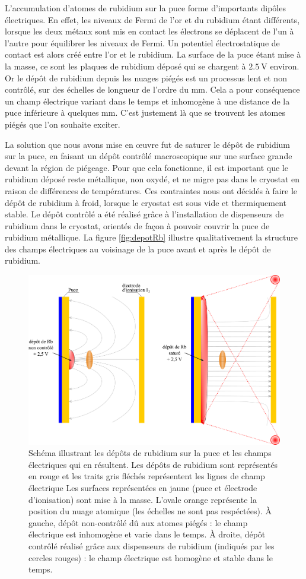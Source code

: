 L'accumulation d'atomes de rubidium sur la puce forme d'importants dipôles électriques.
En effet, les niveaux de Fermi de l'or et du rubidium étant différents, lorsque les deux métaux sont mis en contact les électrons se déplacent de l'un à l'autre pour équilibrer les niveaux de Fermi.
Un potentiel électrostatique de contact est alors créé entre l'or et le rubidium.
La surface de la puce étant mise à la masse, ce sont les plaques de rubidium déposé qui se chargent à $\SI{2.5}{\V}$ environ.
Or le dépôt de rubidium depuis les nuages piégés est un processus lent et non contrôlé, sur des échelles de longueur de l'ordre du $\si{\mm}$.
Cela a pour conséquence un champ électrique variant dans le temps et inhomogène à une distance de la puce inférieure à quelques $\si{\mm}$.
C'est justement là que se trouvent les atomes piégés que l'on souhaite exciter.

La solution que nous avons mise en \oe uvre fut de saturer le dépôt de rubidium sur la puce, en faisant un dépôt contrôlé macroscopique sur une surface grande devant la région de piégeage.
Pour que cela fonctionne, il est important que le rubidium déposé reste métallique, non oxydé, et ne migre pas dans le cryostat en raison de différences de températures.
Ces contraintes nous ont décidés à faire le dépôt de rubidium à froid, lorsque le cryostat est sous vide et thermiquement stable.
Le dépôt contrôlé a été réalisé grâce à l'installation de dispenseurs de rubidium dans le cryostat, orientés de façon à pouvoir couvrir la puce de rubidium métallique.
La figure \eqref{fig:depotRb} illustre qualitativement la structure des champs électriques au voisinage de la puce avant et après le dépôt de rubidium.
%
\begin{figure}[h]
\centering
\includegraphics[width=.7\linewidth]{figures/setup/rydberg/depotRb}
\caption[Dépôt contrôlé de rubidium sur la puce]{
Schéma illustrant les dépôts de rubidium sur la puce et les champs électriques qui en résultent.
Les dépôts de rubidium sont représentés en rouge et les traits gris fléchés représentent les lignes de champ électrique
Les surfaces représentées en jaune (puce et électrode d'ionisation) sont mise à la masse.
L'ovale orange représente la position du nuage atomique (les échelles ne sont pas respéctées).
\`A gauche, dépôt non-contrôlé dû aux atomes piégés : le champ électrique est inhomogène  et varie dans le temps.
\`A droite, dépôt contrôlé réalisé grâce aux dispenseurs de rubidium (indiqués par les cercles rouges) : le champ électrique est homogène et stable dans le temps.
}
\label{fig:depotRb}
\end{figure}

